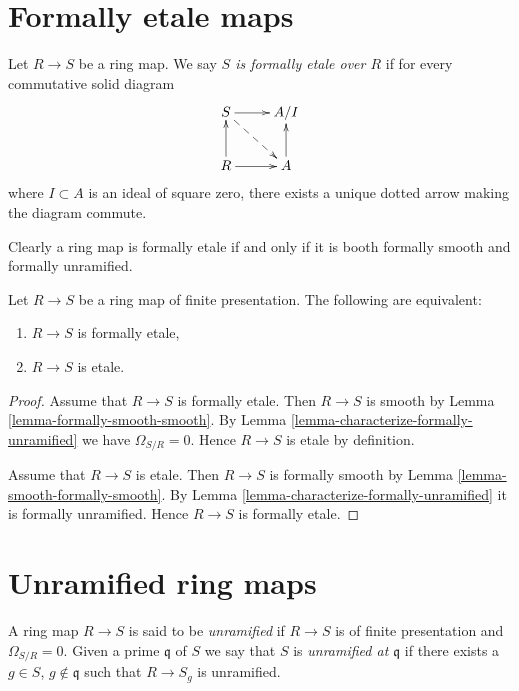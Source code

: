 \section{Formally etale maps}
\label{section-formally-etale}

\begin{definition}
\label{definition-formally-etale}
Let $R \to S$ be a ring map.
We say {\it $S$ is formally etale over $R$} if for every
commutative solid diagram
$$
\xymatrix{
S \ar[r] \ar@{-->}[rd] & A/I \\
R \ar[r] \ar[u] & A \ar[u]
}
$$
where $I \subset A$ is an ideal of square zero, there exists
a unique dotted arrow making the diagram commute.
\end{definition}

\noindent
Clearly a ring map is formally etale if and only if
it is booth formally smooth and formally unramified.

\begin{lemma}
\label{lemma-formally-etale-etale}
Let $R \to S$ be a ring map of finite presentation.
The following are equivalent:
\begin{enumerate}
\item $R \to S$ is formally etale,
\item $R \to S$ is etale.
\end{enumerate}
\end{lemma}

\begin{proof}
Assume that $R \to S$ is formally etale.
Then $R \to S$ is smooth by Lemma \ref{lemma-formally-smooth-smooth}.
By Lemma \ref{lemma-characterize-formally-unramified}
we have $\Omega_{S/R} = 0$.
Hence $R \to S$ is etale by definition.

\medskip\noindent
Assume that $R \to S$ is etale.
Then $R \to S$ is formally smooth by
Lemma \ref{lemma-smooth-formally-smooth}.
By Lemma \ref{lemma-characterize-formally-unramified}
it is formally unramified. Hence $R \to S$ is formally etale.
\end{proof}






\section{Unramified ring maps}
\label{section-unramified}

\begin{definition}
\label{definition-unramified}
A ring map $R \to S$ is said to be
{\it unramified} if $R \to S$ is of finite presentation and
$\Omega_{S/R} = 0$.
Given a prime $\mathfrak q$ of $S$ we say that $S$ is {\it unramified
at $\mathfrak q$} if there exists a $g \in S$, $g \not \in \mathfrak q$
such that $R \to S_g$ is unramified.
\end{definition}

